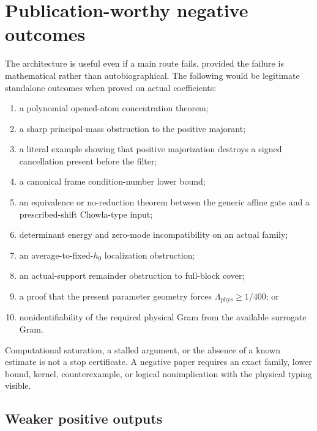 \section{Publication-worthy negative outcomes}
\label{sec:negative}

The architecture is useful even if a main route fails, provided the
failure is mathematical rather than autobiographical.  The following
would be legitimate standalone outcomes when proved on actual
coefficients:
\begin{enumerate}[leftmargin=2em]
\item a polynomial opened-atom concentration theorem;
\item a sharp principal-mass obstruction to the positive majorant;
\item a literal example showing that positive majorization destroys a
  signed cancellation present before the filter;
\item a canonical frame condition-number lower bound;
\item an equivalence or no-reduction theorem between the generic
  affine gate and a prescribed-shift Chowla-type input;
\item determinant energy and zero-mode incompatibility on an actual
  family;
\item an average-to-fixed-\(h_0\) localization obstruction;
\item an actual-support remainder obstruction to full-block cover;
\item a proof that the present parameter geometry forces
  \(\Lambda_{\mathrm{phys}}\ge1/400\); or
\item nonidentifiability of the required physical Gram from the
  available surrogate Gram.
\end{enumerate}

\begin{remark}
Computational saturation, a stalled argument, or the absence of a
known estimate is not a stop certificate.  A negative paper requires
an exact family, lower bound, kernel, counterexample, or logical
nonimplication with the physical typing visible.
\end{remark}

\subsection{Weaker positive outputs}

